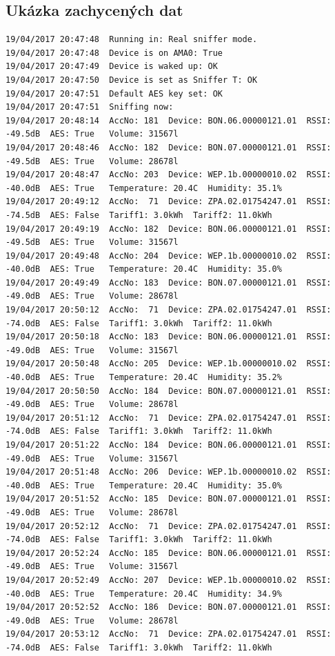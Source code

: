 \begin{landscape}
\chapter{Ukázka zachycených dat}
\label{PrilohaVystup}
	\begin{lstlisting}[style=MyCodeBash]
19/04/2017 20:47:48  Running in: Real sniffer mode.
19/04/2017 20:47:48  Device is on AMA0: True
19/04/2017 20:47:49  Device is waked up: OK
19/04/2017 20:47:50  Device is set as Sniffer T: OK
19/04/2017 20:47:51  Default AES key set: OK
19/04/2017 20:47:51  Sniffing now:
19/04/2017 20:48:14  AccNo: 181  Device: BON.06.00000121.01  RSSI: -49.5dB  AES: True   Volume: 31567l 		
19/04/2017 20:48:46  AccNo: 182  Device: BON.07.00000121.01  RSSI: -49.5dB  AES: True   Volume: 28678l 
19/04/2017 20:48:47  AccNo: 203  Device: WEP.1b.00000010.02  RSSI: -40.0dB  AES: True   Temperature: 20.4C  Humidity: 35.1%
19/04/2017 20:49:12  AccNo:  71  Device: ZPA.02.01754247.01  RSSI: -74.5dB  AES: False  Tariff1: 3.0kWh  Tariff2: 11.0kWh
19/04/2017 20:49:19  AccNo: 182  Device: BON.06.00000121.01  RSSI: -49.5dB  AES: True   Volume: 31567l 
19/04/2017 20:49:48  AccNo: 204  Device: WEP.1b.00000010.02  RSSI: -40.0dB  AES: True   Temperature: 20.4C  Humidity: 35.0%		
19/04/2017 20:49:49  AccNo: 183  Device: BON.07.00000121.01  RSSI: -49.0dB  AES: True   Volume: 28678l
19/04/2017 20:50:12  AccNo:  71  Device: ZPA.02.01754247.01  RSSI: -74.0dB  AES: False  Tariff1: 3.0kWh  Tariff2: 11.0kWh
19/04/2017 20:50:18  AccNo: 183  Device: BON.06.00000121.01  RSSI: -49.0dB  AES: True   Volume: 31567l
19/04/2017 20:50:48  AccNo: 205  Device: WEP.1b.00000010.02  RSSI: -40.0dB  AES: True   Temperature: 20.4C  Humidity: 35.2%
19/04/2017 20:50:50  AccNo: 184  Device: BON.07.00000121.01  RSSI: -49.0dB  AES: True   Volume: 28678l
19/04/2017 20:51:12  AccNo:  71  Device: ZPA.02.01754247.01  RSSI: -74.0dB  AES: False  Tariff1: 3.0kWh  Tariff2: 11.0kWh
19/04/2017 20:51:22  AccNo: 184  Device: BON.06.00000121.01  RSSI: -49.0dB  AES: True   Volume: 31567l
19/04/2017 20:51:48  AccNo: 206  Device: WEP.1b.00000010.02  RSSI: -40.0dB  AES: True   Temperature: 20.4C  Humidity: 35.0%
19/04/2017 20:51:52  AccNo: 185  Device: BON.07.00000121.01  RSSI: -49.0dB  AES: True   Volume: 28678l
19/04/2017 20:52:12  AccNo:  71  Device: ZPA.02.01754247.01  RSSI: -74.0dB  AES: False  Tariff1: 3.0kWh  Tariff2: 11.0kWh
19/04/2017 20:52:24  AccNo: 185  Device: BON.06.00000121.01  RSSI: -49.0dB  AES: True   Volume: 31567l 
19/04/2017 20:52:49  AccNo: 207  Device: WEP.1b.00000010.02  RSSI: -40.0dB  AES: True   Temperature: 20.4C  Humidity: 34.9%
19/04/2017 20:52:52  AccNo: 186  Device: BON.07.00000121.01  RSSI: -49.0dB  AES: True   Volume: 28678l
19/04/2017 20:53:12  AccNo:  71  Device: ZPA.02.01754247.01  RSSI: -74.0dB  AES: False  Tariff1: 3.0kWh  Tariff2: 11.0kWh
	\end{lstlisting}
\end{landscape}
	
